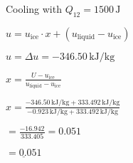 Cooling with \( Q_{12} = 1500 \, \text{J} \)  

\( u = u_{\text{ice}} \cdot x + (u_{\text{liquid}} - u_{\text{ice}}) \)  

\( u = \Delta u = -346.50 \, \text{kJ/kg} \)  

\( x = \frac{U - u_{\text{ice}}}{u_{\text{liquid}} - u_{\text{ice}}} \)  

\( x = \frac{-346.50 \, \text{kJ/kg} + 333.492 \, \text{kJ/kg}}{-0.923 \, \text{kJ/kg} + 333.492 \, \text{kJ/kg}} \)  

\( = \frac{-16.942}{333.405} = 0.051 \)  

\( \underline{= 0.051} \)
